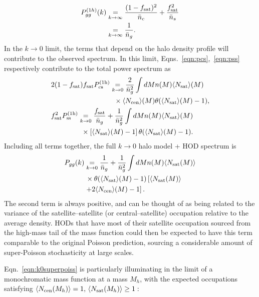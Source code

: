 \documentclass[fleqn,usenatbib]{mnras}
\begin{document}
\begin{align}
    P_{gg}^{(1h)} (k) &\underset{k \to \infty}{=} \frac{(1-f_{\rm sat})^2}{\bar{n}_c} + \frac{f_{\rm sat}^2}{\bar{n}_s} \\
    &\underset{k \to \infty}{=} \frac{1}{\bar{n}_g}.
\end{align}
In the $k \to 0$ limit, the terms that depend on the halo density profile will contribute to the observed spectrum. In this limit, Eqns.~\ref{eqn:pcs},~\ref{eqn:pss} respectively contribute to the total power spectrum as 
\begin{align}
    \nonumber{}&2(1-f_{\rm sat})f_{\rm sat}P_{\rm cs}^{{\rm (1h)}}\underset{k \to 0}{=}  \frac{2}{\bar{n}_g^2} \int dM n(M) \langle N_{\rm sat} \rangle (M)  \\
    & \quad \quad\quad\quad\quad\quad\quad\quad\quad \times  \langle N_{\rm cen} \rangle (M)\theta(\langle N_{\rm sat} \rangle (M) - 1), \\
    \nonumber{}&f_{\rm sat}^2 P_{\rm ss}^{{\rm (1h)}} \underset{k \to 0}{=}  \frac{f_{\rm sat}}{\bar{n}_g} + \frac{1}{\bar{n}_g^2} \int dM n(M) \langle N_{\rm sat} \rangle (M)\\
    & \,\,\quad\quad\quad\quad  \times  \left [ \langle N_{\rm sat} \rangle (M) - 1 \right ] \theta(\langle N_{\rm sat} \rangle (M) - 1).
\end{align}
Including all terms together, the full $k\to 0 $ halo model + HOD spectrum is
\begin{align}
\label{eqn:k0superpoiss}
    P_{gg} (k)\nonumber{}&\underset{k \to 0}{=} \frac{1}{\bar{n}_g} + \frac{1}{\bar{n}_g^2} \int dM n(M) \langle N_{\rm sat} (M) \rangle  \\
    \nonumber{}&\, \times\theta(\langle N_{\rm sat} \rangle (M) - 1) \left [ \langle N_{\rm sat} (M) \rangle \right.  \\
    &\left. + 2 \langle N_{\rm cen} \rangle (M) - 1\right ].  
\end{align}
The second term is always positive, and can be thought of as being related to the variance of the satellite--satellite (or central--satellite) occupation relative to the average density. HODs that have most of their satellite occupation sourced from the high-mass tail of the mass function could then be expected to have this term comparable to the original Poisson prediction, sourcing a considerable amount of super-Poisson stochasticity at large scales. \par 
Eqn.~\ref{eqn:k0superpoiss} is particularly illuminating in the limit of a monochromatic mass function at a mass $M_h$, with the expected occupations satisfying $\langle N_{\rm cen} (M_h)\rangle = 1,\, \langle N_{\rm sat}(M_h) \rangle \geq 1:$
\end{document}
